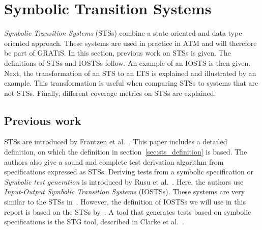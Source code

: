 \section{Symbolic Transition Systems}\label{sec:symbolic}
\textit{Symbolic Transition Systems} (STSs) combine a state oriented and data type oriented approach. These systems are used in practice in ATM and will therefore be part of GRATiS. In this section, previous work on STSs is given. The definitions of STSs and IOSTSs follow. An example of an IOSTS is then given. Next, the transformation of an STS to an LTS is explained and illustrated by an example. This transformation is useful when comparing STSs to systems that are not STSs. Finally, different coverage metrics on STSs are explained.

\subsection{Previous work}
STSs are introduced by Frantzen et al.~\cite{Frantzen:Symbolic}. This paper includes a detailed definition, on which the definition in section~\ref{sec:sts_definition} is based. The authors also give a sound and complete test derivation algorithm from specifications expressed as STSs. Deriving tests from a symbolic specification or \textit{Symbolic test generation} is introduced by Rusu et al.~\cite{rusu:symbolic}. Here, the authors use \textit{Input-Output Symbolic Transition Systems} (IOSTSs). These systems are very similar to the STSs in~\cite{Frantzen:Symbolic}. However, the definition of IOSTSs we will use in this report is based on the STSs by~\cite{Frantzen:Symbolic}. A tool that generates tests based on symbolic specifications is the STG tool, described in Clarke et al.~\cite{clarke:STG}.


